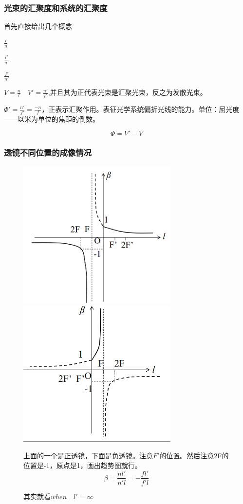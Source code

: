 \subsubsection{光束的汇聚度和系统的汇聚度}
首先直接给出几个概念
\begin{description}[nosep]%
    \item[折合物距] $\displaystyle \frac{l}{n}$
    \item[折合像距]$\displaystyle \frac{l'}{n'}$
    \item[折合焦距]   $\displaystyle \frac{f'}{n'}$
    \item[汇聚度] $\displaystyle V=\frac{n}{l} \quad V'=\frac{n'}{l'}$,并且其为正代表光束是汇聚光束，反之为发散光束。
    \item[光焦度]  $\displaystyle \Phi'=\frac{n'}{f'}=\frac{-n}{f}$，正表示汇聚作用。表征光学系统偏折光线的能力。单位：屈光度——以米为单位的焦距的倒数。
\end{description}
\begin{equation}
\Phi=V'-V \tag{2.3.8}
\end{equation}
\subsubsection{透镜不同位置的成像情况}
        \begin{figure}[H]
            \centering
            \includegraphics[width=8cm]{img/3.6.png}
            \includegraphics[width=8cm]{img/3.7.png}
            \caption[]{其实就看$when \quad l'=\infty$}
            上面的一个是正透镜，下面是负透镜。注意$F'$的位置。然后注意2F的位置是-1，原点是1，画出趋势图就行。
            $$
            \beta=\frac{nl'}{n'l}=-\frac{fl'}{f'l}
            $$
            \end{figure} 
